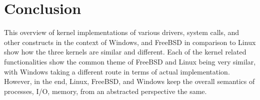 \section{Conclusion}
This overview of kernel implementations of various drivers, system calls, and other constructs in the context of Windows, and FreeBSD in comparison to Linux show how the three kernels are similar and different. Each of the kernel related functionalities show the common theme of FreeBSD and Linux being very similar, with Windows taking a different route in terms of actual implementation. However, in the end, Linux, FreeBSD, and Windows keep the overall semantics of processes, I/O, memory, from an abstracted perspective the same.

